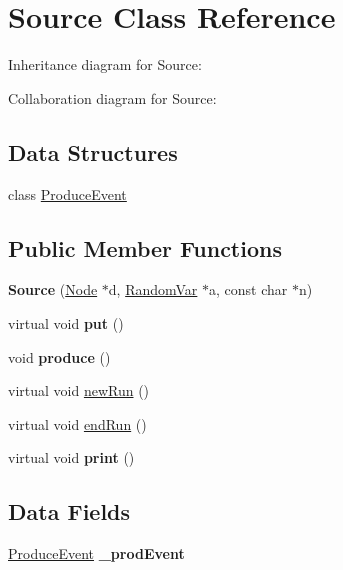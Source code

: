 \hypertarget{classSource}{}\section{Source Class Reference}
\label{classSource}


Inheritance diagram for Source\+:


Collaboration diagram for Source\+:
\subsection*{Data Structures}
\begin{DoxyCompactItemize}
\item 
class \hyperlink{classSource_1_1ProduceEvent}{Produce\+Event}
\end{DoxyCompactItemize}
\subsection*{Public Member Functions}
\begin{DoxyCompactItemize}
\item 
{\bfseries Source} (\hyperlink{classNode}{Node} $\ast$d, \hyperlink{classMetaSim_1_1RandomVar}{Random\+Var} $\ast$a, const char $\ast$n)\hypertarget{classSource_a59c2b9126064e5e4d512860e0c77b559}{}\label{classSource_a59c2b9126064e5e4d512860e0c77b559}

\item 
virtual void {\bfseries put} ()\hypertarget{classSource_ae3c687d94ab98cec0804d8b84a29ca59}{}\label{classSource_ae3c687d94ab98cec0804d8b84a29ca59}

\item 
void {\bfseries produce} ()\hypertarget{classSource_a2a64d8ae01ba44b46f90c5b2ffe7ab21}{}\label{classSource_a2a64d8ae01ba44b46f90c5b2ffe7ab21}

\item 
virtual void \hyperlink{classSource_ac93437b75678d35efaf8b92cdf0092fa}{new\+Run} ()
\item 
virtual void \hyperlink{classSource_a0d2c0f43c2acdaa1abe06b2d83cf3a48}{end\+Run} ()
\item 
virtual void {\bfseries print} ()\hypertarget{classSource_a03efc8f0b65d77edea2765296bdc7e23}{}\label{classSource_a03efc8f0b65d77edea2765296bdc7e23}

\end{DoxyCompactItemize}
\subsection*{Data Fields}
\begin{DoxyCompactItemize}
\item 
\hyperlink{classSource_1_1ProduceEvent}{Produce\+Event} {\bfseries \+\_\+prod\+Event}\hypertarget{classSource_ab037a1bd0520d23a10b0d76ec5a2b2d6}{}\label{classSource_ab037a1bd0520d23a10b0d76ec5a2b2d6}

\end{DoxyCompactItemize}
